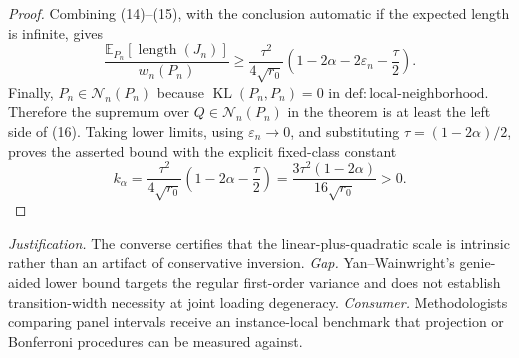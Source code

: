 \documentclass{article}
\begin{document}
\begin{proof}
Combining (14)--(15), with the conclusion automatic if the expected length is infinite, gives
\[
\frac{\mathbb E_{P_n}[\operatorname{length}(J_n)]}{w_n(P_n)}
\geq
\frac{\tau^2}{4\sqrt{r_0}}
\left(1-2\alpha-2\varepsilon_n-\frac\tau2\right). \tag{16}
\]
Finally, \(P_n\in\mathcal N_n(P_n)\) because \(\operatorname{KL}(P_n,P_n)=0\) in \(\mathrm{def{:}local\mbox{-}neighborhood}\).  Therefore the supremum over \(Q\in\mathcal N_n(P_n)\) in the theorem is at least the left side of (16).  Taking lower limits, using \(\varepsilon_n\to0\), and substituting \(\tau=(1-2\alpha)/2\), proves the asserted bound with the explicit fixed-class constant
\[
k_\alpha
=\frac{\tau^2}{4\sqrt{r_0}}
\left(1-2\alpha-\frac\tau2\right)
=\frac{3\tau^2(1-2\alpha)}{16\sqrt{r_0}}>0.
\]
\end{proof}
\par\smallskip\noindent \textit{Justification.} The converse certifies that the linear-plus-quadratic scale is intrinsic rather than an artifact of conservative inversion. \textit{Gap.} Yan--Wainwright's genie-aided lower bound targets the regular first-order variance and does not establish transition-width necessity at joint loading degeneracy. \textit{Consumer.} Methodologists comparing panel intervals receive an instance-local benchmark that projection or Bonferroni procedures can be measured against.
\end{document}
